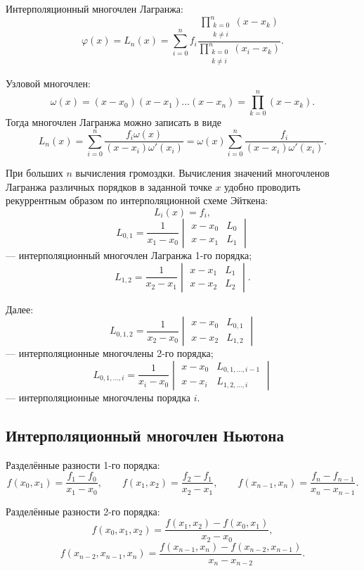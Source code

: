 \documentclass[12pt,a4paper]{article}
\begin{document}
Интерполяционный многочлен Лагранжа:
\begin{equation}
\varphi(x)=L_n(x)=
\sum_{i=0}^{n}f_i
\frac{\prod\limits_{\substack{k=0\\k\ne i}}^{n}(x-x_k)}
{\prod\limits_{\substack{k=0\\k\ne i}}^{n}(x_i-x_k)}.
\end{equation}

Узловой многочлен:
\[
\omega(x)=(x-x_0)(x-x_1)\ldots(x-x_n)=\prod_{k=0}^{n}(x-x_k).
\]
Тогда многочлен Лагранжа можно записать в виде
\[
L_n(x)=
\sum_{i=0}^{n}
\frac{f_i\omega(x)}{(x-x_i)\omega'(x_i)}
=
\omega(x)
\sum_{i=0}^{n}
\frac{f_i}{(x-x_i)\omega'(x_i)}.
\]

При больших $n$ вычисления громоздки. Вычисления значений многочленов Лагранжа различных порядков в заданной точке $x$ удобно проводить рекуррентным образом по интерполяционной схеме Эйткена:
\[
L_i(x)=f_i,
\]
\[
L_{0,1}=
\frac{1}{x_1-x_0}
\begin{vmatrix}
x-x_0 & L_0\\
x-x_1 & L_1
\end{vmatrix}
\]
--- интерполяционный многочлен Лагранжа 1-го порядка;
\[
L_{1,2}=
\frac{1}{x_2-x_1}
\begin{vmatrix}
x-x_1 & L_1\\
x-x_2 & L_2
\end{vmatrix}.
\]

Далее:
\[
L_{0,1,2}=
\frac{1}{x_2-x_0}
\begin{vmatrix}
x-x_0 & L_{0,1}\\
x-x_2 & L_{1,2}
\end{vmatrix}
\]
--- интерполяционные многочлены 2-го порядка;
\[
L_{0,1,\ldots,i}=
\frac{1}{x_i-x_0}
\begin{vmatrix}
x-x_0 & L_{0,1,\ldots,i-1}\\
x-x_i & L_{1,2,\ldots,i}
\end{vmatrix}
\]
--- интерполяционные многочлены порядка $i$.

\subsection{Интерполяционный многочлен Ньютона}

Разделённые разности 1-го порядка:
\[
f(x_0,x_1)=\frac{f_1-f_0}{x_1-x_0},\qquad
f(x_1,x_2)=\frac{f_2-f_1}{x_2-x_1},\qquad
f(x_{n-1},x_n)=\frac{f_n-f_{n-1}}{x_n-x_{n-1}}.
\]

Разделённые разности 2-го порядка:
\[
f(x_0,x_1,x_2)=\frac{f(x_1,x_2)-f(x_0,x_1)}{x_2-x_0},
\]
\[
f(x_{n-2},x_{n-1},x_n)=
\frac{f(x_{n-1},x_n)-f(x_{n-2},x_{n-1})}{x_n-x_{n-2}}.
\]
\end{document}

